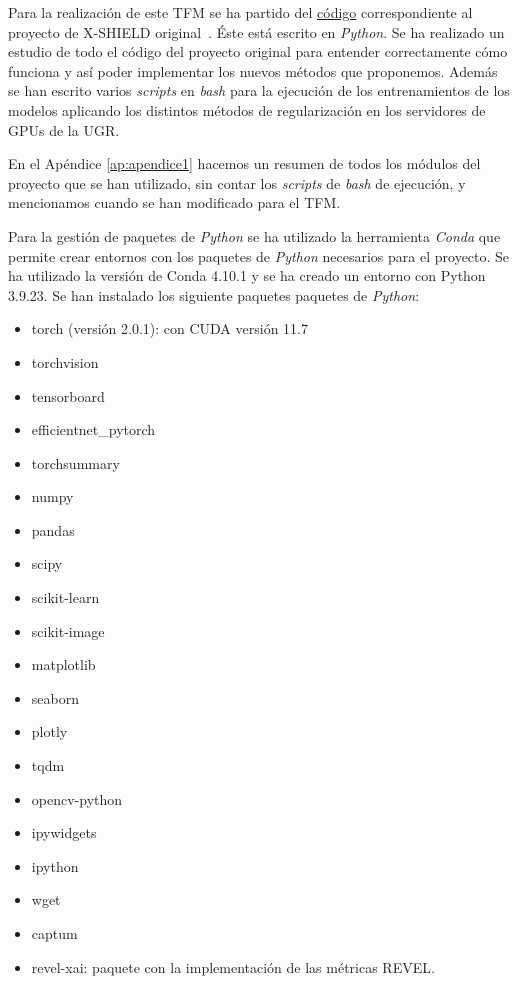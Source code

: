Para la realización de este TFM se ha partido del \href{https://github.com/isega24/SHIELD/tree/X-SHIELD}{código} correspondiente al proyecto de X-SHIELD original~\cite{XSHIELD}. Éste está escrito en \textit{Python}. Se ha realizado un estudio de todo el código del proyecto original para entender correctamente cómo funciona y así poder implementar los nuevos métodos que proponemos. Además se han escrito varios \textit{scripts} en \textit{bash} para la ejecución de los entrenamientos de los modelos aplicando los distintos métodos de regularización  en los servidores de GPUs de la UGR.

En el Apéndice \ref{ap:apendice1} hacemos un resumen de todos los módulos del proyecto que se han utilizado, sin contar los \textit{scripts} de \textit{bash} de ejecución, y mencionamos cuando se han modificado para el TFM. 



Para la gestión de paquetes de \textit{Python} se ha utilizado la herramienta \textit{Conda} que permite crear entornos con los paquetes de \textit{Python} necesarios para el proyecto. Se ha utilizado la versión de Conda 4.10.1 y se ha creado un entorno con Python 3.9.23. Se han instalado los siguiente paquetes paquetes de \textit{Python}:

\begin{itemize}
    \item torch (versión 2.0.1): con CUDA versión 11.7
    \item torchvision
    \item tensorboard
    \item efficientnet\_pytorch
    \item torchsummary
    \item numpy
    \item pandas
    \item scipy
    \item scikit-learn
    \item scikit-image
    \item matplotlib
    \item seaborn
    \item plotly
    \item tqdm
    \item opencv-python
    \item ipywidgets
    \item ipython
    \item wget
    \item captum
    \item revel-xai: paquete con la implementación de las métricas REVEL.
\end{itemize}

